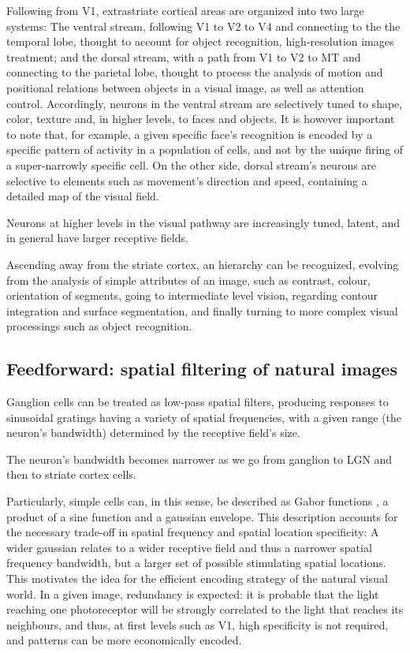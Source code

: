 Following from V1, extrastriate cortical areas are organized into two large systems: The ventral stream, following V1 to V2 to V4 and connecting to the the temporal lobe, thought to account for object recognition, high-resolution images treatment; and the dorsal stream, with a path from V1 to V2 to MT and connecting to the parietal lobe, thought to process the analysis of motion and positional relations between objects in a visual image, as well as attention control. Accordingly, neurons in the ventral stream are selectively tuned to shape, color, texture and, in higher levels, to faces and objects. It is however important to note that, for example, a given specific face's recognition is encoded by a specific pattern of activity in a population of cells, and not by the unique firing of a super-narrowly specific cell. On the other side, dorsal stream's neurons are selective to elements such as movement's direction and speed, containing a detailed map of the visual field.

Neurons at higher levels in the visual pathway are increasingly tuned, latent, and in general have larger receptive fields.

Ascending away from the striate cortex, an hierarchy can be recognized, evolving from the analysis of simple attributes of an image, such as contrast, colour, orientation of segments, going to intermediate level vision, regarding contour integration and surface segmentation, and finally turning to more complex visual processings such as object recognition. 


\vspace{-0.2cm}
 
\subsection{Feedforward: spatial filtering of natural images}

Ganglion cells can be treated as low-pass spatial filters, producing responses to sinusoidal gratings having a variety of spatial frequencies, with a given range (the neuron's bandwidth) determined by the receptive field's size. 

The neuron's bandwidth becomes narrower as we go from ganglion to LGN and then to striate cortex cells. 

Particularly, simple cells can, in this sense, be described as Gabor functions \cite{noGabor}, a product of a sine function and a gaussian envelope. This description accounts for the necessary trade-off in spatial frequency and spatial location specificity: A wider gaussian relates to a wider receptive field and thus a narrower spatial frequency bandwidth, but a larger set of possible stimulating spatial locations. This motivates the idea for the efficient encoding strategy of the natural visual world. In a given image, redundancy is expected: it is probable that the light reaching one photoreceptor will be strongly correlated to the light that reaches its neighbours, and thus, at first levels such as V1, high specificity is not required, and patterns can be more economically encoded.

